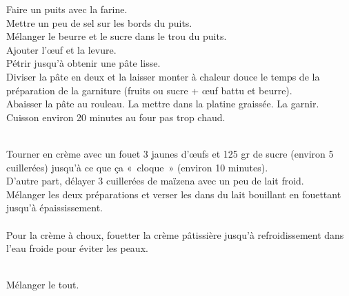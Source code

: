 \begin{minipage}[c]{\textwidth}
Faire un puits avec la farine. \\
Mettre un peu de sel sur les bords du puits.\\
Mélanger le beurre et le sucre dans le trou du puits.\\
Ajouter l’œuf et la levure.\\
Pétrir jusqu’à obtenir une pâte lisse.\\
Diviser la pâte en deux et la laisser monter à chaleur douce le temps de la préparation de la garniture (fruits ou sucre + œuf battu et beurre).\\
Abaisser la pâte au rouleau. La mettre dans la platine graissée. La garnir.\\
Cuisson environ 20 minutes au four pas trop chaud.\\
\\

\end{minipage}

\begin{minipage}[c]{\textwidth}
Tourner en crème avec un fouet 3 jaunes d’œufs et 125 gr de sucre (environ 5 cuillerées) jusqu’à ce que ça « cloque » (environ 10 minutes).\\
D’autre part, délayer 3 cuillerées de maïzena avec un peu de lait froid.\\
Mélanger les deux préparations et verser les dans du lait bouillant en fouettant jusqu’à épaississement.\\
\\
Pour la crème à choux, fouetter la crème pâtissière jusqu’à refroidissement dans l’eau froide pour éviter les peaux.\\
\\

\end{minipage}

\begin{minipage}[c]{\textwidth}
Mélanger le tout.\\
\\

\end{minipage}

